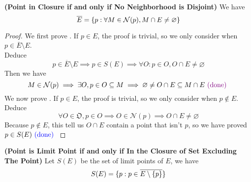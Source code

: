 \documentclass{report}
\begin{document}
\begin{lemma}
\label{2.6.11}
\textbf{(Point in Closure if and only if No Neighborhood is Disjoint)} We have
\begin{equation}
\overline{E}=\{ p: \forall M\in \mathcal{N}(p), M\cap E\neq \varnothing \}
\end{equation}
\end{lemma}
\begin{proof}
We first prove . If $p \in E$, the proof is trivial, so we only consider when $p\in \overline{E}\setminus E$.\\

Deduce
\begin{equation}
p\in \overline{E}\setminus E\implies p\in  S(E)\implies \forall O:p\in  O, O\cap E\neq \varnothing 
\end{equation}
Then we have
\begin{equation}
M \in \mathcal{N}(p) \implies \exists O, p \in O \subseteq M \implies \varnothing\neq  O\cap E \subseteq M \cap E\textcolor{violet}{\text{ (done) }}
\end{equation}
We now prove . If $p\in  E$, the proof is trivial, so we only consider when $p\not\in E$.\\

Deduce
\begin{equation}
\forall O\in \mathfrak{O}, p\in  O\implies O\in \mathcal{N}(p)\implies O\cap E\neq \varnothing
\end{equation}
Because $p\not\in E$, this tell us $O\cap E$ contain a point that isn't $p$, so we have proved  $p\in  S(E)\textcolor{blue}{\text{ (done) }}$ 



\end{proof}
\begin{theorem}
\label{2.6.12}
\textbf{(Point is Limit Point if and only if In the Closure of Set Excluding The Point)} Let $S(E)$ be the set of limit points of $E$, we have  
\begin{equation}
S(E)=\{ p:p \in \overline{E\setminus \{ p \}} \}
\end{equation}
\end{theorem}
\end{document}
